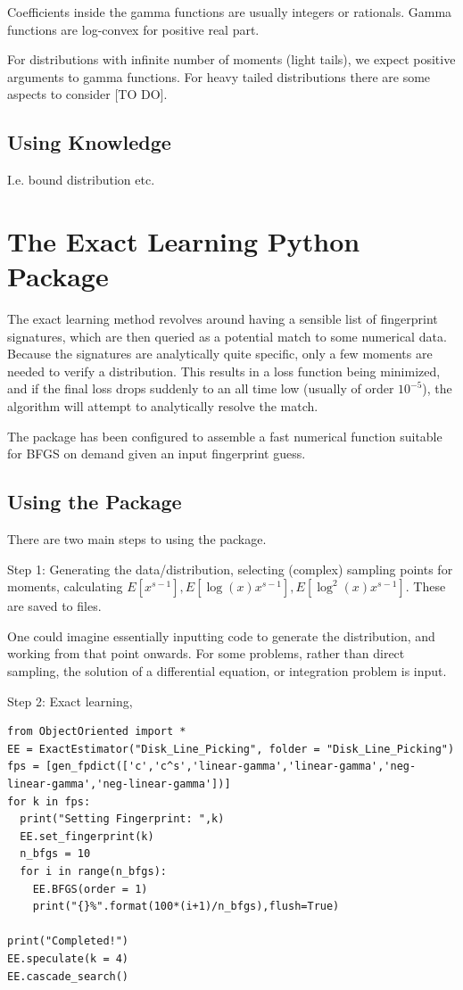 \documentclass{article}
\begin{document}
Coefficients inside the gamma functions are usually integers or rationals.
Gamma functions are log-convex for positive real part.

For distributions with infinite number of moments (light tails), we expect positive arguments to gamma functions. For heavy tailed distributions there are some aspects to consider [TO DO].


\subsection{Using Knowledge}
I.e. bound distribution etc.



\section{The Exact Learning Python Package}
The exact learning method revolves around having a sensible list of fingerprint signatures, which are then queried as a potential match to some numerical data. Because the signatures are analytically quite specific, only a few moments are needed to verify a distribution. This results in a loss function being minimized, and if the final loss drops suddenly to an all time low (usually of order $10^{-5}$), the algorithm will attempt to analytically resolve the match. 

The package has been configured to assemble a fast numerical function suitable for BFGS on demand given an input fingerprint guess.

\subsection{Using the Package}
There are two main steps to using the package.

Step 1:	Generating the data/distribution, selecting (complex) sampling points for moments, calculating $E[x^{s-1}], E[\log(x) x^{s-1}], E[\log^2(x) x^{s-1}]$. These are saved to files.

One could imagine essentially inputting code to generate the distribution, and working from that point onwards. For some problems, rather than direct sampling, the solution of a differential equation, or integration problem is input.


Step 2: Exact learning,
\begin{verbatim}
from ObjectOriented import *
EE = ExactEstimator("Disk_Line_Picking", folder = "Disk_Line_Picking")
fps = [gen_fpdict(['c','c^s','linear-gamma','linear-gamma','neg-linear-gamma','neg-linear-gamma'])]
for k in fps:
  print("Setting Fingerprint: ",k)
  EE.set_fingerprint(k)
  n_bfgs = 10
  for i in range(n_bfgs):
    EE.BFGS(order = 1)
    print("{}%".format(100*(i+1)/n_bfgs),flush=True)

print("Completed!")
EE.speculate(k = 4)
EE.cascade_search()
\end{verbatim}
\end{document}
